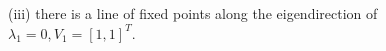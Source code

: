 \documentclass[12pt]{article}
\begin{document}
\begin{ex}
\begin{solution}
\begin{enumerate}[(i)]
  \begin{figure}[h]
    \centering
    \caption{(iii) there is a line of fixed points along the eigendirection of $\lambda_1=0,V_1=[1,1]^T$.}
    \label{Figure_iii}
  \end{figure}

  
  \end{enumerate}
  
\end{solution}
\end{ex}
\end{document}
